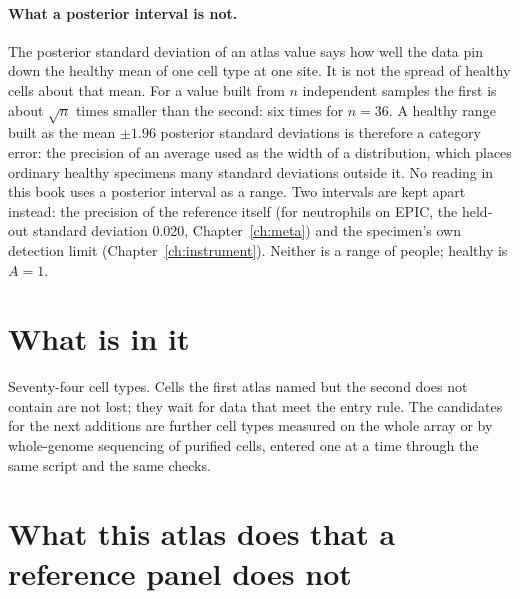 \paragraph{What a posterior interval is not.} The posterior standard deviation of an atlas value says how well the data pin down
the healthy mean of one cell type at one site. It is not the spread of healthy cells about that mean. For a value built from $n$
independent samples the first is about $\sqrt n$ times smaller than the second: six times for $n=36$. \derived{} A healthy range
built as the mean $\pm1.96$ posterior standard deviations is therefore a category error: the precision of an average used as the
width of a distribution, which places ordinary healthy specimens many standard deviations outside it. No reading in this book uses
a posterior interval as a range. Two intervals are kept apart instead: the precision of the reference itself (for neutrophils on
EPIC, the held-out standard deviation 0.020, Chapter~\ref{ch:meta}) and the specimen's own detection limit
(Chapter~\ref{ch:instrument}). Neither is a range of people; healthy is $A=1$.


\section{What is in it}

Seventy-four cell types. Cells the first atlas named but the second does not contain are not lost; they wait for data that meet
the entry rule. The candidates for the next additions are further cell types measured on the whole array or by whole-genome sequencing of purified
cells, entered one at a time through the same script and the same checks.

\section{What this atlas does that a reference panel does not}


